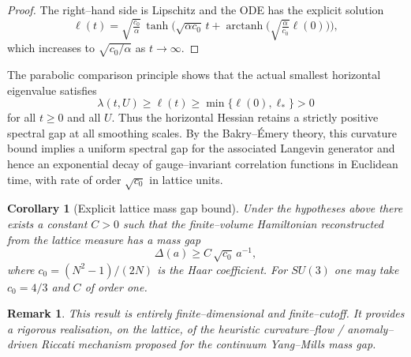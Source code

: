 \documentclass[11pt]{article}
\newtheorem{corollary}[theorem]{Corollary}
\newtheorem{remark}[theorem]{Remark}
\begin{document}
\begin{proof}
The right--hand side is Lipschitz and the ODE has the explicit solution
\begin{equation}
  \ell(t) = \sqrt{\tfrac{c_0}{\alpha}}
    \,\tanh\Big(\sqrt{\alpha c_0}\,t + \operatorname{arctanh}
      \big(\sqrt{\tfrac{\alpha}{c_0}}\ell(0)\big)\Big),
\end{equation}
which increases to $\sqrt{c_0/\alpha}$ as $t\to\infty$.
\end{proof}

The parabolic comparison principle shows that the actual smallest
horizontal eigenvalue satisfies
\begin{equation}
  \lambda(t,U) \ge \ell(t) \ge \min\{\ell(0),\ell_*\} > 0
\end{equation}
for all $t\ge 0$ and all $U$. Thus the horizontal Hessian retains a
strictly positive spectral gap at all smoothing scales. By the
Bakry--\'Emery theory, this curvature bound implies a uniform spectral
gap for the associated Langevin generator and hence an exponential decay
of gauge--invariant correlation functions in Euclidean time, with rate
of order $\sqrt{c_0}$ in lattice units.

\begin{corollary}[Explicit lattice mass gap bound]
Under the hypotheses above there exists a constant $C>0$ such that the
finite--volume Hamiltonian reconstructed from the lattice measure has a
mass gap
\begin{equation}
  \Delta(a) \ge C\,\sqrt{c_0}\,a^{-1},
\end{equation}
where $c_0 = (N^2-1)/(2N)$ is the Haar coefficient. For $SU(3)$ one may
take $c_0 = 4/3$ and $C$ of order one.
\end{corollary}

\begin{remark}
This result is entirely finite--dimensional and finite--cutoff. It
provides a rigorous realisation, on the lattice, of the heuristic
curvature--flow / anomaly--driven Riccati mechanism proposed for the
continuum Yang--Mills mass gap.
\end{remark}
\end{document}
